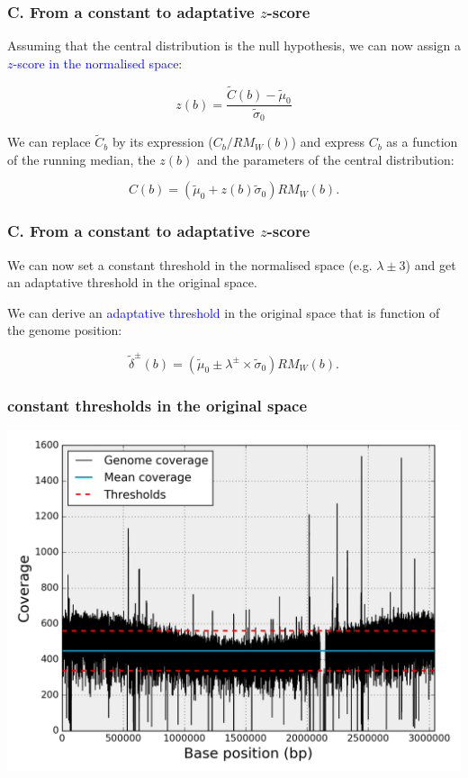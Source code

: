 \documentclass{beamer}
\begin{document}
\begin{frame}
\frametitle{C. From a constant to adaptative $z$-score}

Assuming that the central distribution is the null hypothesis, 
we can now  assign a \textcolor{blue}{$z$-score in the normalised space}:

\begin{equation}
z(b) = \frac{\widetilde{C}(b)-\widetilde{\mu}_0}{\widetilde{\sigma}_0}
\nonumber
\end{equation}

We can  replace $\widetilde{C}_b$ by its expression  ($C_b / RM_W(b)$) and
express $C_b$ as a function of the running median, the $z(b)$ and the 
parameters 
of the central distribution:

\begin{equation}
C(b) = \left(  \widetilde{\mu}_0  + z(b) \widetilde{\sigma}_0  \right)RM_W(b).
\nonumber
\end{equation}

\end{frame}

\begin{frame}
\frametitle{C. From a constant to adaptative $z$-score}
\begin{block}{}
We can now set a constant threshold in the normalised space (e.g. $\lambda \pm 
3$) 
and get an adaptative threshold in the original space.
\end{block}

We can 
derive an \textcolor{blue}{adaptative threshold} in the 
original space that is function of the genome position: 

\begin{equation}
\tilde{\delta}^\pm(b) = \left( \widetilde{\mu}_0 \pm \lambda^\pm\times 
\widetilde{\sigma}_0    \right)RM_W(b).
\end{equation}

\end{frame}

\begin{frame}
 \frametitle{constant thresholds in the original space}
\includegraphics[height=0.9\textheight, 
    width=1\textwidth]{images/fig1.png}
 \end{frame}
\end{document}
